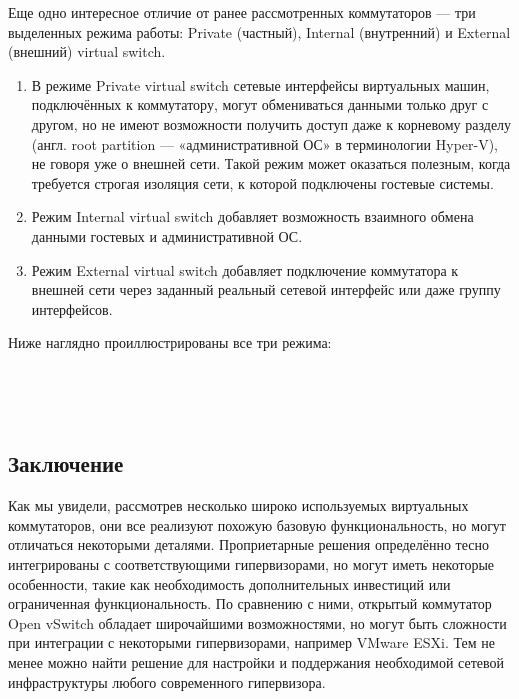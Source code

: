 \documentclass[14pt, a4paper]{article}
\begin{document}
Еще одно интересное отличие от ранее рассмотренных коммутаторов — три выделенных режима
работы: Private (частный), Internal (внутренний) и External (внешний) virtual switch.

\begin{enumerate}
    \item В режиме Private virtual switch сетевые интерфейсы виртуальных машин, подключённых к
    коммутатору, могут обмениваться данными только друг с другом, но не имеют возможности
    получить доступ даже к корневому разделу (англ. root partition — «административной ОС» в
    терминологии Hyper-V), не говоря уже о внешней сети. Такой режим может оказаться
    полезным, когда требуется строгая изоляция сети, к которой подключены гостевые системы.
    \item Режим Internal virtual switch добавляет возможность взаимного обмена данными гостевых и
    административной ОС.
    \item Режим External virtual switch добавляет подключение коммутатора к внешней сети через
    заданный реальный сетевой интерфейс или даже группу интерфейсов.
\end{enumerate}

Ниже наглядно проиллюстрированы все три режима:

\newpage

\begin{figure}[h]
    \centering
     \\
    \label{framework} 
\end{figure}

\begin{figure}[h]
    \centering
     \\
    \label{framework} 
\end{figure}

\begin{figure}[h]
    \centering
    \label{framework} 
\end{figure}

\newpage

\subsection*{Заключение} 

Как мы увидели, рассмотрев несколько широко используемых виртуальных коммутаторов, они все
реализуют похожую базовую функциональность, но могут отличаться некоторыми деталями.
Проприетарные решения определённо тесно интегрированы с соответствующими гипервизорами, но
могут иметь некоторые особенности, такие как необходимость дополнительных инвестиций или
ограниченная функциональность. По сравнению с ними, открытый коммутатор Open vSwitch обладает
широчайшими возможностями, но могут быть сложности при интеграции с некоторыми
гипервизорами, например VMware ESXi. Тем не менее можно найти решение для настройки и
поддержания необходимой сетевой инфраструктуры любого современного гипервизора.\\
\end{document}
